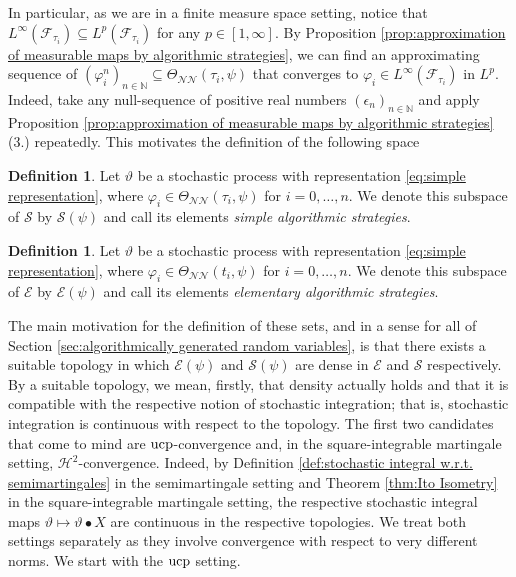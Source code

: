 \documentclass[11pt,a4paper,twoside,openany]{report}
\numberwithin{equation}{section}
\theoremstyle{plain} %
\theoremstyle{definition} %
\newtheorem{definition}[theorem]{Definition}
\theoremstyle{remark} %
\begin{document}
In particular, as we are in a finite measure space setting, notice that \(L^{\infty}(\mathcal{F}_{\tau_i})\subseteq L^{p}(\mathcal{F}_{\tau_i})\) for any \(p\in[1,\infty]\). By Proposition \ref{prop:approximation of measurable maps by algorithmic strategies}, we can find an approximating sequence of \((\varphi_i^n)_{n\in\mathbb{N}}\subseteq\Theta_{\mathcal{NN}}(\tau_i,\psi)\) that converges to \(\varphi_i\in L^{\infty}(\mathcal{F}_{\tau_i})\) in \(L^p\). Indeed, take any null-sequence of positive real numbers \((\epsilon_n)_{n\in\mathbb{N}}\) and apply Proposition \ref{prop:approximation of measurable maps by algorithmic strategies} (3.) repeatedly. This motivates the definition of the following space
\begin{definition}
    Let \(\vartheta\) be a stochastic process with representation \eqref{eq:simple representation}, where \(\varphi_i\in\Theta_{\mathcal{NN}}(\tau_i,\psi)\) for \(i=0,\dots,n\). We denote this subspace of \(\mathcal{S}\) by \(\mathcal{S}(\psi)\) and call its elements \textit{simple algorithmic strategies}.
\end{definition}
\begin{definition}
    Let \(\vartheta\) be a stochastic process with representation \eqref{eq:simple representation}, where \(\varphi_i\in\Theta_{\mathcal{NN}}(t_i,\psi)\) for \(i=0,\dots,n\). We denote this subspace of \(\mathcal{E}\) by \(\mathcal{E}(\psi)\) and call its elements \textit{elementary algorithmic strategies}.
\end{definition}
The main motivation for the definition of these sets, and in a sense for all of Section \ref{sec:algorithmically generated random variables}, is that there exists a suitable topology in which \(\mathcal{E}(\psi)\) and \(\mathcal{S}(\psi)\) are dense in \(\mathcal{E}\) and \(\mathcal{S}\) respectively. By a suitable topology, we mean, firstly, that density actually holds and that it is compatible with the respective notion of stochastic integration; that is, stochastic integration is continuous with respect to the topology. The first two candidates that come to mind are \(\rm{ucp}\)-convergence and, in the square-integrable martingale setting, \(\mathcal{H}^2\)-convergence. Indeed, by Definition \ref{def:stochastic integral w.r.t. semimartingales} in the semimartingale setting and Theorem \ref{thm:Ito Isometry} in the square-integrable martingale setting, the respective stochastic integral maps \(\vartheta\mapsto \vartheta\bullet X\) are continuous in the respective topologies. We treat both settings separately as they involve convergence with respect to very different norms. We start with the \(\rm{ucp}\) setting. 
\end{document}
